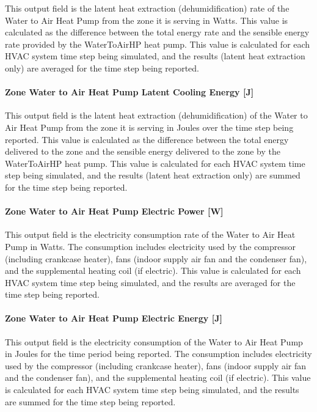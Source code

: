 This output field is the latent heat extraction (dehumidification) rate of the Water to Air Heat Pump from the zone it is serving in Watts. This value is calculated as the difference between the total energy rate and the sensible energy rate provided by the WaterToAirHP heat pump. This value is calculated for each HVAC system time step being simulated, and the results (latent heat extraction only) are averaged for the time step being reported.

\paragraph{Zone Water to Air Heat Pump Latent Cooling Energy {[}J{]}}\label{zone-water-to-air-heat-pump-latent-cooling-energy-j}

This output field is the latent heat extraction (dehumidification) of the Water to Air Heat Pump from the zone it is serving in Joules over the time step being reported. This value is calculated as the difference between the total energy delivered to the zone and the sensible energy delivered to the zone by the WaterToAirHP heat pump. This value is calculated for each HVAC system time step being simulated, and the results (latent heat extraction only) are summed for the time step being reported.

\paragraph{Zone Water to Air Heat Pump Electric Power {[}W{]}}\label{zone-water-to-air-heat-pump-electric-power-w}

This output field is the electricity consumption rate of the Water to Air Heat Pump in Watts. The consumption includes electricity used by the compressor (including crankcase heater), fans (indoor supply air fan and the condenser fan), and the supplemental heating coil (if electric). This value is calculated for each HVAC system time step being simulated, and the results are averaged for the time step being reported.

\paragraph{Zone Water to Air Heat Pump Electric Energy {[}J{]}}\label{zone-water-to-air-heat-pump-electric-energy-j}

This output field is the electricity consumption of the Water to Air Heat Pump in Joules for the time period being reported. The consumption includes electricity used by the compressor (including crankcase heater), fans (indoor supply air fan and the condenser fan), and the supplemental heating coil (if electric). This value is calculated for each HVAC system time step being simulated, and the results are summed for the time step being reported.

